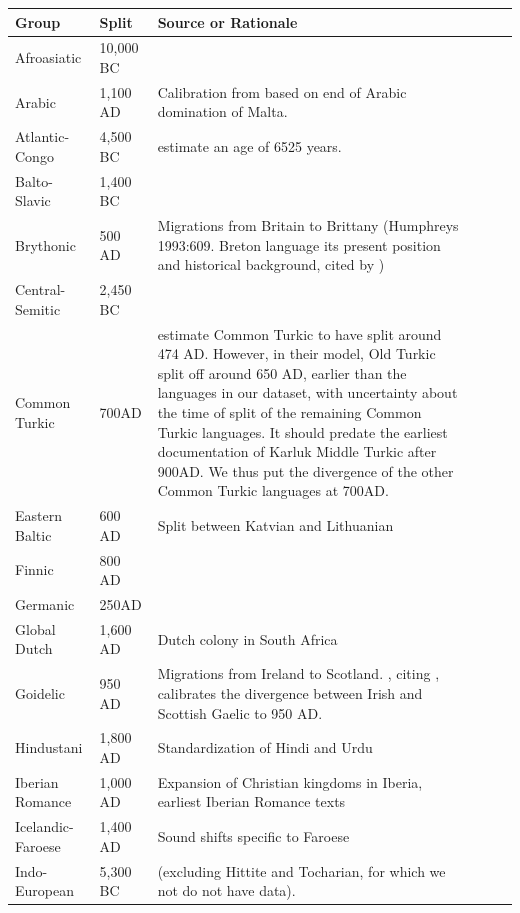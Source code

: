 \documentclass[11pt,a4paper]{article}
\begin{document}
\begin{longtable}{llp{10cm}lll}
Group & Split & Source or Rationale \\ \hline
Afroasiatic & 10,000 BC & \cite{diakonoff1998the} \\
Arabic & 1,100 AD & Calibration from \citep{holman2011automated} based on end of Arabic domination of Malta. \\
Atlantic-Congo & 4,500 BC & \citet{holman2011automated} estimate an age of 6525 years.\\
Balto-Slavic & 1,400 BC & \citep{gray2003language} \\
	Brythonic & 500 AD & Migrations from Britain to Brittany (Humphreys 1993:609. Breton language its present position and historical background, cited by \citet{holman2011automated})\\
Central-Semitic & 2,450 BC & \citep{kitchen2009bayesian}   \\
Common Turkic & 700AD & \cite[p. 49]{savelyev2020bayesian} estimate Common Turkic to have split around 474 AD. However, in their model, Old Turkic split off around 650 AD, earlier than the languages in our dataset, with uncertainty about the time of split of the remaining Common Turkic languages. It should predate the earliest documentation of Karluk Middle Turkic after 900AD. We thus put the divergence of the other Common Turkic languages at 700AD. \\
Eastern Baltic & 600 AD & Split between Katvian and Lithuanian \citep[p. 209]{novotna2011glottochronology}\\
Finnic & 800 AD & \cite[Section 4.1]{maurits2020best} \\
Germanic & 250AD & \cite{gray2003language} \\
Global Dutch & 1,600 AD & Dutch colony in South Africa \\
Goidelic & 950 AD & Migrations from Ireland to Scotland. \citet{holman2011automated}, citing \citet{jackson1951gaelic}, calibrates the divergence between Irish and Scottish Gaelic to 950 AD. \\
Hindustani & 1,800 AD & Standardization of Hindi and Urdu\\
Iberian Romance & 1,000 AD & Expansion of Christian kingdoms in Iberia, earliest Iberian Romance texts \\
Icelandic-Faroese & 1,400 AD & Sound shifts specific to Faroese\\
Indo-European & 5,300 BC & \citep{gray2003language} (excluding Hittite and Tocharian, for which we not do not have data). \\

\end{longtable}
\end{document}
